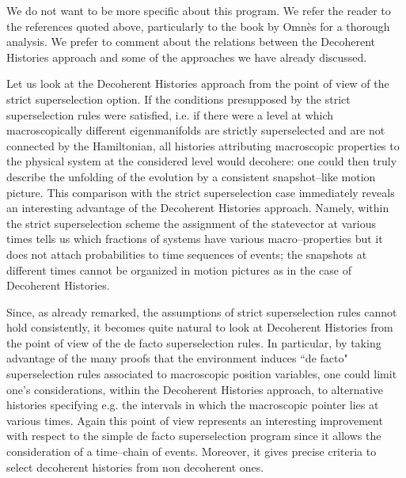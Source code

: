 \documentclass[12pt]{article}
\begin{document}
We do not want to be more specific about this program. We refer
the reader to the references quoted above, particularly to the
book \cite{omn2} by Omn\`es for a thorough analysis. We prefer to
comment about the relations between the Decoherent Histories
approach and some of the approaches we have already discussed.

Let us look at the Decoherent Histories approach from the point of
view of the strict superselection  option. If the conditions
presupposed by the strict superselection rules were satisfied,
i.e. if there were a level at which macroscopically different
eigenmanifolds are strictly superselected and are not connected by
the Hamiltonian, all histories attributing macroscopic properties
to the physical system at the considered level would decohere: one
could then truly describe the unfolding of the evolution by a
consistent snapshot--like motion picture. This comparison with the
strict superselection case immediately reveals an interesting
advantage of the Decoherent Histories approach. Namely, within the
strict superselection scheme the assignment of the statevector at
various times tells us which fractions of systems have various
macro--properties but it does not attach probabilities to time
sequences of events; the snapshots at different times cannot be
organized in motion pictures as in the case of Decoherent
Histories.

Since, as already remarked, the assumptions of strict
superselection rules cannot hold consistently, it becomes quite
natural to look at Decoherent Histories from the point of view of
the de facto superselection rules. In particular, by taking
advantage of the many proofs that the environment induces ``de
facto" superselection rules associated to macroscopic position
variables, one could limit one's considerations, within the
Decoherent Histories approach, to alternative histories specifying
e.g. the intervals in which the macroscopic pointer lies at
various times. Again this point of view represents an interesting
improvement with respect to the simple de facto superselection
program since it allows the consideration of a time--chain of
events. Moreover, it gives precise criteria to select decoherent
histories from non decoherent ones.
\end{document}
